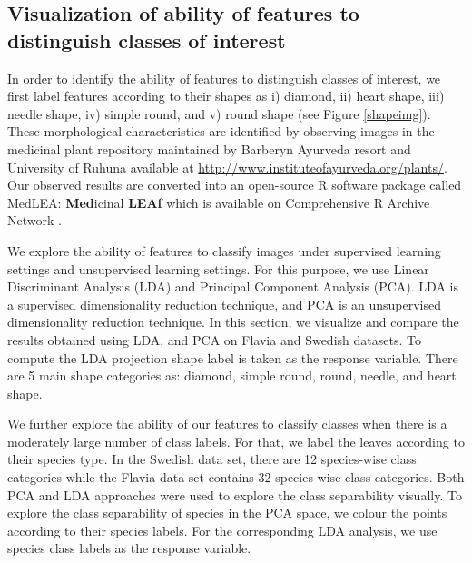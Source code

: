 \documentclass{article}
\begin{document}
\hypertarget{visualization-of-ability-of-features-to-distinguish-classes-of-interest}{%
\subsection{Visualization of ability of features to distinguish classes
of
interest}\label{visualization-of-ability-of-features-to-distinguish-classes-of-interest}}

In order to identify the ability of features to distinguish classes of
interest, we first label features according to their shapes as i)
diamond, ii) heart shape, iii) needle shape, iv) simple round, and v)
round shape (see Figure \ref{shapeimg}). These morphological
characteristics are identified by observing images in the medicinal
plant repository maintained by Barberyn Ayurveda resort and University
of Ruhuna available at \url{http://www.instituteofayurveda.org/plants/}.
Our observed results are converted into an open-source R software package
called MedLEA: \textbf{Med}icinal \textbf{LEAf} which is available on
Comprehensive R Archive Network \citep{medlea}.

We explore the ability of features to classify images under
supervised learning settings and unsupervised learning settings. For this
purpose, we use Linear Discriminant Analysis (LDA) and Principal
Component Analysis (PCA). LDA is a supervised dimensionality reduction
technique, and PCA is an unsupervised dimensionality reduction technique.
In this section, we visualize and compare the results obtained using
LDA, and PCA on Flavia and Swedish datasets. To compute the LDA projection
shape label is taken as the response variable. There are 5 main shape
categories as: diamond, simple round, round, needle, and heart shape.

We further explore the ability of our features to classify classes when there is a moderately large number of class labels. For that, we label the leaves according to their species type. In the Swedish data set, there are 12 species-wise class categories while the Flavia data set contains 32 species-wise class categories. Both PCA and LDA approaches were used to explore the class separability visually. To explore the class separability of species in the PCA space, we colour the points according to their species labels. For the corresponding LDA analysis, we use species class labels as the response variable.
\end{document}
